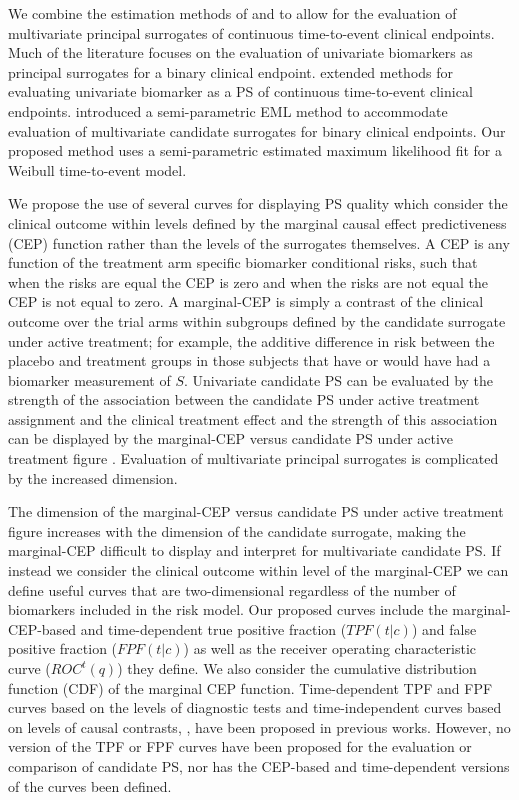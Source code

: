 \documentclass[times, doublespace]{simauth}
\begin{document}
We combine the estimation methods of \citet{Gabriel13} and  \citet{Huang11}  to allow for the evaluation of multivariate principal surrogates of continuous time-to-event clinical endpoints. Much of the literature focuses on the evaluation of univariate biomarkers as principal surrogates for a binary clinical endpoint. \citet{Gabriel13} extended methods for evaluating univariate biomarker as a PS of continuous time-to-event clinical endpoints. \citet{Huang11} introduced a semi-parametric EML method to accommodate evaluation of multivariate candidate surrogates for binary clinical endpoints.  Our proposed method uses a semi-parametric estimated maximum likelihood fit for a Weibull time-to-event model. 

We propose the use of several curves for displaying PS quality which consider the clinical outcome within levels defined by the marginal causal effect predictiveness (CEP) function rather than the levels of the surrogates themselves. A CEP is any function of the treatment arm specific biomarker conditional risks, such that when the risks are equal the CEP is zero and when the risks are not equal the CEP is not equal to zero. A marginal-CEP is simply a contrast of the clinical outcome over the trial arms within subgroups defined by the candidate surrogate under active treatment; for example, the additive difference in risk between the placebo and treatment groups in those subjects that have or would have had a biomarker measurement of $S$. Univariate candidate PS can be evaluated by the strength of the association between the candidate PS under active treatment assignment and the clinical treatment effect and the strength of this association can be displayed by the marginal-CEP versus candidate PS under active treatment figure \citep{Gilbert08}. Evaluation of multivariate principal surrogates is complicated by the increased dimension.  

The dimension of the marginal-CEP versus candidate PS under active treatment figure increases with the dimension of the candidate surrogate, making the marginal-CEP difficult to display and interpret for multivariate candidate PS. If instead we consider the clinical outcome within level of the marginal-CEP we can define useful curves that are two-dimensional regardless of the number of biomarkers included in the risk model. Our proposed curves include the marginal-CEP-based and time-dependent true positive fraction ($TPF(t|c)$) and false positive fraction ($FPF(t|c)$) as well as the receiver operating characteristic curve ($ROC^{t}(q)$) they define. We also consider the cumulative distribution function (CDF) of the marginal CEP function. Time-dependent TPF and FPF curves based on the levels of diagnostic tests and time-independent curves based on levels of causal contrasts, \citep{Huang12b}, have been proposed in previous works. However, no version of the TPF or FPF curves have been proposed for the evaluation or comparison of candidate PS, nor has the CEP-based and time-dependent versions of the curves been defined. 
\end{document}
